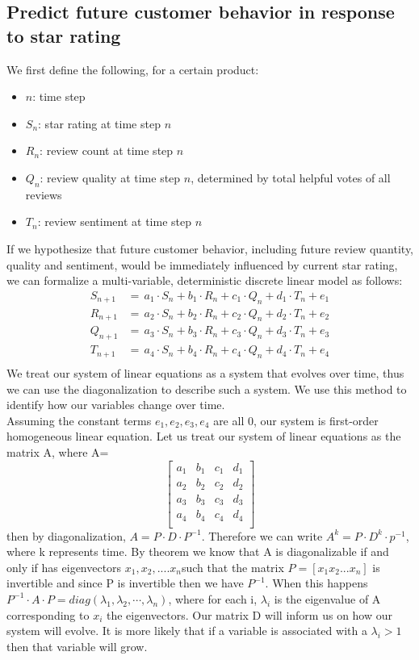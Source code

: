 \documentclass[reqno]{article}
\theoremstyle{definition}
\theoremstyle{definition}
\theoremstyle{remark}
\begin{document}
\subsection{Predict future customer behavior in response to star rating}
We first define the following, for a certain product:
\begin{itemize}
    \item $n$: time step
    \item $S_n$: star rating at time step $n$
    \item $R_n$: review count at time step $n$
    \item $Q_n$: review quality at time step $n$, determined by total helpful votes of all reviews
    \item $T_n$: review sentiment at time step $n$
\end{itemize}
If we hypothesize that future customer behavior, including future review quantity, quality and sentiment, would be immediately influenced by current star rating, we can formalize a multi-variable, deterministic discrete linear model as follows:
\begin{align*}
S_{n+1} & = \, a_1 \cdot S_n + b_1 \cdot R_n + c_1 \cdot Q_n + d_1 \cdot T_n+ e_1 \\
R_{n+1} & = \, a_2 \cdot S_n + b_2 \cdot R_n + c_2 \cdot Q_n + d_2 \cdot T_n + e_2 \\
Q_{n+1} & = \, a_3 \cdot S_n + b_3 \cdot R_n + c_3 \cdot Q_n + d_3 \cdot T_n+ e_3 \\
T_{n+1} & = \, a_4 \cdot S_n + b_4 \cdot R_n + c_4 \cdot Q_n + d_4 \cdot T_n+ e_4 \\
\end{align*}
We treat our system of linear equations as a system that evolves over time, thus we can use the diagonalization to describe such a system. We use this method to identify how our variables change over time. \\
Assuming the constant terms $e_1, e_2, e_3, e_4$ are all 0, our system is first-order homogeneous linear equation. Let us treat our system of linear equations as the matrix A, where A=
$$
\begin{bmatrix}
a_1&b_1&c_1&d_1\\
a_2&b_2&c_2&d_2\\
a_3&b_3&c_3&d_3\\
a_4&b_4&c_4&d_4\\
\end{bmatrix}
$$
then by diagonalization, \(A=P\cdot D\cdot P^{-1}\). Therefore we can write $A^k=P\cdot D^k\cdot p^{-1}$, where k represents time. By theorem we know that A is diagonalizable if and only if has eigenvectors \textbf{\(x_1,x_2,....x_n\)}such that the matrix $P=[x_1 x_2 ... x_n]$ is invertible and since P is invertible then we have $P^{-1}$. When this happens $P^{-1}\cdot A\cdot P= diag(\lambda_1,\lambda_2,\cdots, \lambda_n)$, where for each i, $\lambda_i$ is the eigenvalue of A corresponding to $x_i$ the eigenvectors. Our matrix D will inform us on how our system will evolve. It is more likely that if a variable is associated with a $\lambda_i>1$ then that variable will grow.
\end{document}
